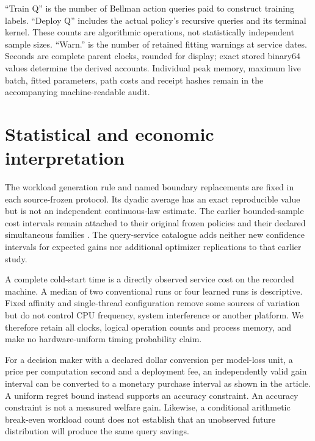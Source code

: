 ``Train Q'' is the number of Bellman action queries paid to construct training labels. ``Deploy Q'' includes the actual policy's recursive queries and its terminal kernel. These counts are algorithmic operations, not statistically independent sample sizes. ``Warn.'' is the number of retained fitting warnings at service dates. Seconds are complete parent clocks, rounded for display; exact stored binary64 values determine the derived accounts. Individual peak memory, maximum live batch, fitted parameters, path costs and receipt hashes remain in the accompanying machine-readable audit.




\section{Statistical and economic interpretation}\label{supp:interpretation65}
The workload generation rule and named boundary replacements are fixed in each source-frozen protocol. Its dyadic average has an exact reproducible value but is not an independent continuous-law estimate. The earlier bounded-sample cost intervals remain attached to their original frozen policies and their declared simultaneous families \citep{maurer2009}. The query-service catalogue adds neither new confidence intervals for expected gains nor additional optimizer replications to that earlier study.

A complete cold-start time is a directly observed service cost on the recorded machine. A median of two conventional runs or four learned runs is descriptive. Fixed affinity and single-thread configuration remove some sources of variation but do not control CPU frequency, system interference or another platform. We therefore retain all clocks, logical operation counts and process memory, and make no hardware-uniform timing probability claim.

For a decision maker with a declared dollar conversion per model-loss unit, a price per computation second and a deployment fee, an independently valid gain interval can be converted to a monetary purchase interval as shown in the article. A uniform regret bound instead supports an accuracy constraint. An accuracy constraint is not a measured welfare gain. Likewise, a conditional arithmetic break-even workload count does not establish that an unobserved future distribution will produce the same query savings.

